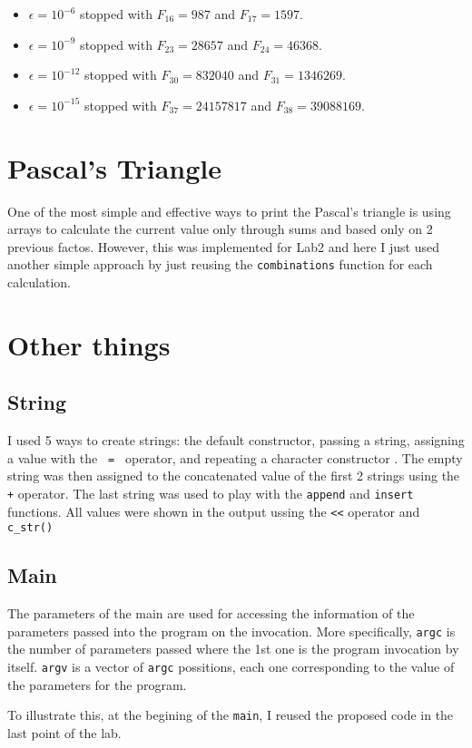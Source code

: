 \documentclass{article}
\begin{document}
\begin{itemize}
\item $\epsilon=10^{-6}$ stopped with $F_{16}=987$ and $F_{17}=1597$. 
\item $\epsilon=10^{-9}$ stopped with $F_{23}=28657$ and $F_{24}=46368$. 
\item $\epsilon=10^{-12}$ stopped with $F_{30}=832040$ and $F_{31}=1346269$. 
\item $\epsilon=10^{-15}$ stopped with $F_{37}=24157817$ and $F_{38}=39088169$. 
\end{itemize} 

\section{Pascal's Triangle}
One of the most simple and effective ways to print the Pascal's triangle
is using arrays to calculate the current value only through sums and
based only on 2 previous factos. 
However, this was implemented for Lab2 and here I just used
another simple approach by just reusing the \verb+combinations+ function
for each calculation.

\section{Other things}
\subsection{String}
I used 5 ways to create strings: the default constructor, passing a string,
assigning a value with the \verb+ = + operator, and repeating a character 
constructor \cite{cpp}. 
The empty string was then assigned to the concatenated value of
the first 2 strings using the \verb|+| operator. The last string was
used to play with the \verb+append+ and \verb+insert+ functions. 
All values were shown in the output ussing the \verb+<<+ operator and
\verb+c_str()+ 

\subsection{Main}
The parameters of the main are used for accessing the information
of the parameters passed into the program on the invocation.
More specifically, \verb+argc+ is the number of parameters passed 
where the 1st one is the program invocation by itself.
\verb+argv+ is a vector of \verb+argc+ possitions, each one corresponding
to the value of the parameters for the program.

To illustrate this, at the begining of the \verb+main+, I reused the proposed
code in the last point of the lab.



\end{document}
